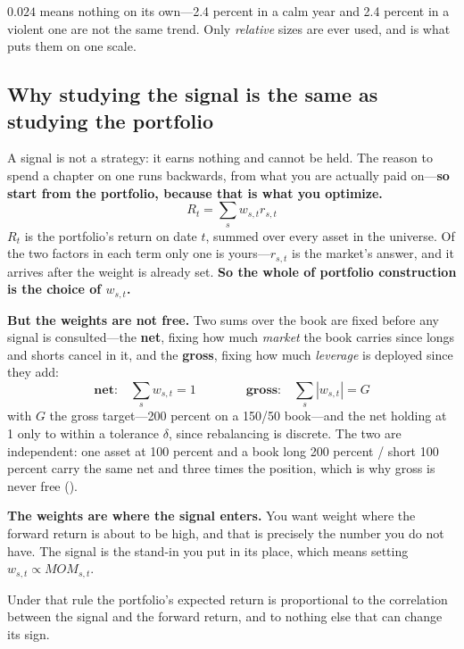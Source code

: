 \begin{note}
$0.024$ means nothing on its own---2.4 percent in a calm year and 2.4 percent in a violent one are
not the same trend. Only \emph{relative} sizes are ever used, and  is what
puts them on one scale.
\end{note}

\subsection{Why studying the signal is the same as studying the portfolio}\label{sec:signal-is-portfolio}

A signal is not a strategy: it earns nothing and cannot be held. The reason to spend a chapter on
one runs backwards, from what you are actually paid on---\textbf{so start from the portfolio,
because that is what you optimize.}
\[
  R_t = \sum_s w_{s,t} r_{s,t}
\]
$R_t$ is the portfolio's return on date $t$, summed over every asset in the universe. Of the two
factors in each term only one is yours---$r_{s,t}$ is the market's answer, and it arrives after the
weight is already set. \textbf{So the whole of portfolio construction is the choice of $w_{s,t}$.}

\textbf{But the weights are not free.} Two sums over the book are fixed before any signal is
consulted---the \textbf{net}, fixing how much \emph{market} the book carries since longs and shorts
cancel in it, and the \textbf{gross}, fixing how much \emph{leverage} is deployed since they add:
\[
  \textbf{net:} \quad \sum_s w_{s,t} = 1
  \qquad\qquad
  \textbf{gross:} \quad \sum_s \left| w_{s,t} \right| = G
\]
with $G$ the gross target---200 percent on a 150/50 book---and the net holding at 1 only to within a
tolerance $\delta$, since rebalancing is discrete. The two are independent: one asset at 100 percent
and a book long 200 percent / short 100 percent carry the same net and three times the position,
which is why gross is never free ().

\textbf{The weights are where the signal enters.} You want weight where the forward return is about
to be high, and that is precisely the number you do not have. The signal is the stand-in you put in
its place, which means setting $w_{s,t} \propto \mathit{MOM}_{s,t}$.

\begin{claim}\label{clm:rho-is-everything}
Under that rule the portfolio's expected return is proportional to the correlation between the
signal and the forward return, and to nothing else that can change its sign.
\end{claim}

